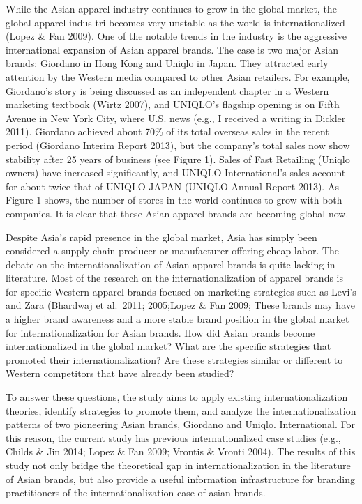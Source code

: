 \documentclass[12pt,]{article}
\begin{document}
While the Asian apparel industry continues to grow in the global market,
the global apparel indus tri becomes very unstable as the world is
internationalized (Lopez \& Fan 2009). One of the notable trends in the
industry is the aggressive international expansion of Asian apparel
brands. The case is two major Asian brands: Giordano in Hong Kong and
Uniqlo in Japan. They attracted early attention by the Western media
compared to other Asian retailers. For example, Giordano's story is
being discussed as an independent chapter in a Western marketing
textbook (Wirtz 2007), and UNIQLO's flagship opening is on Fifth Avenue
in New York City, where U.S. news (e.g., I received a writing in Dickler
2011). Giordano achieved about 70\% of its total overseas sales in the
recent period (Giordano Interim Report 2013), but the company's total
sales now show stability after 25 years of business (see Figure 1).
Sales of Fast Retailing (Uniqlo owners) have increased significantly,
and UNIQLO International's sales account for about twice that of UNIQLO
JAPAN (UNIQLO Annual Report 2013). As Figure 1 shows, the number of
stores in the world continues to grow with both companies. It is clear
that these Asian apparel brands are becoming global now.

Despite Asia's rapid presence in the global market, Asia has simply been
considered a supply chain producer or manufacturer offering cheap labor.
The debate on the internationalization of Asian apparel brands is quite
lacking in literature. Most of the research on the internationalization
of apparel brands is for specific Western apparel brands focused on
marketing strategies such as Levi's and Zara (Bhardwaj et al.~2011;
2005;Lopez \& Fan 2009; These brands may have a higher brand awareness
and a more stable brand position in the global market for
internationalization for Asian brands. How did Asian brands become
internationalized in the global market? What are the specific strategies
that promoted their internationalization? Are these strategies similar
or different to Western competitors that have already been studied?

To answer these questions, the study aims to apply existing
internationalization theories, identify strategies to promote them, and
analyze the internationalization patterns of two pioneering Asian
brands, Giordano and Uniqlo. International. For this reason, the current
study has previous internationalized case studies (e.g., Childs \& Jin
2014; Lopez \& Fan 2009; Vrontis \& Vronti 2004). The results of this
study not only bridge the theoretical gap in internationalization in the
literature of Asian brands, but also provide a useful information
infrastructure for branding practitioners of the internationalization
case of asian brands.
\end{document}
